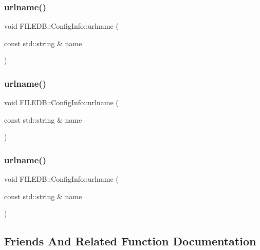 \subsubsection{\texorpdfstring{urlname()}{urlname()}\hspace{0.1cm}{\footnotesize\ttfamily [4/6]}}
{\footnotesize\ttfamily void F\+I\+L\+E\+D\+B\+::\+Config\+Info\+::urlname (\begin{DoxyParamCaption}\item[{const std\+::string \&}]{name }\end{DoxyParamCaption})}

\mbox{\label{classFILEDB_1_1ConfigInfo_a49750ae80347780d48415cb7aac9a068}} 
\subsubsection{\texorpdfstring{urlname()}{urlname()}\hspace{0.1cm}{\footnotesize\ttfamily [5/6]}}
{\footnotesize\ttfamily void F\+I\+L\+E\+D\+B\+::\+Config\+Info\+::urlname (\begin{DoxyParamCaption}\item[{const std\+::string \&}]{name }\end{DoxyParamCaption})}

\mbox{\label{classFILEDB_1_1ConfigInfo_a49750ae80347780d48415cb7aac9a068}} 
\subsubsection{\texorpdfstring{urlname()}{urlname()}\hspace{0.1cm}{\footnotesize\ttfamily [6/6]}}
{\footnotesize\ttfamily void F\+I\+L\+E\+D\+B\+::\+Config\+Info\+::urlname (\begin{DoxyParamCaption}\item[{const std\+::string \&}]{name }\end{DoxyParamCaption})}



\subsection{Friends And Related Function Documentation}
\mbox{\label{classFILEDB_1_1ConfigInfo_a2aa453414301c12055ae76f2bfdc8f87}} 
